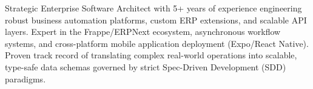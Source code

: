 
\begin{cvparagraph}
  Strategic Enterprise Software Architect with 5+ years of experience engineering robust business automation platforms, custom ERP extensions, and scalable API layers. Expert in the Frappe/ERPNext ecosystem, asynchronous workflow systems, and cross-platform mobile application deployment (Expo/React Native). Proven track record of translating complex real-world operations into scalable, type-safe data schemas governed by strict Spec-Driven Development (SDD) paradigms.
\end{cvparagraph}
